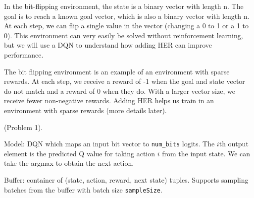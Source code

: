 \documentclass[11pt]{article}
\begin{document}
\begin{center}
	{\footnotesize
	In the bit-flipping environment, the state is a binary vector with length n. The goal is to
	reach a known goal vector, which is also a binary vector with length n. At each step, we can
	flip a single value in the vector (changing a 0 to 1 or a 1 to 0). This environment can very
	easily be solved without reinforcement learning, but we will use a DQN to understand how
	adding HER can improve performance.
	
	The bit flipping environment is an example of an environment with sparse rewards. At each
	step, we receive a reward of -1 when the goal and state vector do not match and a reward of
	0 when they do. With a larger vector size, we receive fewer non-negative rewards. Adding
	HER helps us train in an environment with sparse rewards (more details later).
}
\end{center}


 (Problem 1). 

\begin{compactitem}
	\item Model: DQN which maps an input bit vector to \texttt{num\_bits} logits. The $i$th output element is the predicted Q value for taking action $i$ from the input state. We can take the argmax to obtain the next action.
	
	\item Buffer: container of (state, action, reward, next state) tuples. Supports sampling batches from the buffer with batch size \texttt{sampleSize}. 
\end{compactitem}
\end{document}
